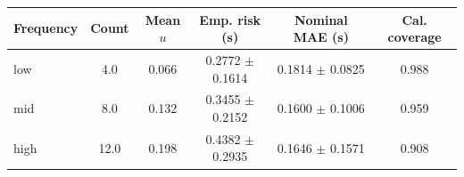 \begin{tabular}{lccccc}
\hline
Frequency & Count & Mean $u$ & Emp. risk (s) & Nominal MAE (s) & Cal. coverage \\
\hline
low & 4.0 & 0.066 & 0.2772 $\pm$ 0.1614 & 0.1814 $\pm$ 0.0825 & 0.988 \\
mid & 8.0 & 0.132 & 0.3455 $\pm$ 0.2152 & 0.1600 $\pm$ 0.1006 & 0.959 \\
high & 12.0 & 0.198 & 0.4382 $\pm$ 0.2935 & 0.1646 $\pm$ 0.1571 & 0.908 \\
\hline
\end{tabular}
